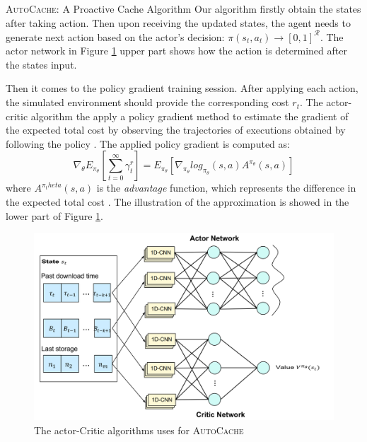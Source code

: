 \documentclass{article}
\begin{document}
\begin{section}{\textsc{AutoCache}: A Proactive Cache Algorithm}
    Our algorithm firstly obtain the states after taking action.
    Then upon receiving the updated states, the agent needs to generate next action based on the actor's decision: $\pi(s_t, a_t) \to [0,1]^{\mathcal{R}}$. The actor network in Figure \ref{fig:a3c} upper part shows how the action is determined after the states input.
    
    Then it comes to the policy gradient training session. After applying each action, the simulated environment should provide the corresponding cost $r_t$. The actor-critic algorithm the apply a policy gradient method to estimate the gradient of the expected total cost by observing the trajectories of executions obtained by following the policy \cite{Pensieve}. The applied policy gradient is computed as:
    $$
    \nabla_\theta E_{\pi_\theta}[\sum_{t=0}^{\infty} \gamma^ r_t] = E_{\pi_\theta} [\nabla_{\pi_\theta} log_{\pi_\theta}(s,a) A^{\pi_\theta}(s,a)]
    $$
    where $A^{\pi_theta}(s,a)$ is the \textit{advantage} function, which represents the difference in the expected total cost \cite{Pensieve}. The illustration of the approximation is showed in the lower part of Figure \ref{fig:a3c}.

    \begin{figure}[htp]
        \centering
        \includegraphics[width=0.8\linewidth]{a3c-network.png}
        \caption{The actor-Critic algorithms uses for \textsc{AutoCache}}
        \label{fig:a3c}
    \end{figure}
    
\end{section}
\end{document}
